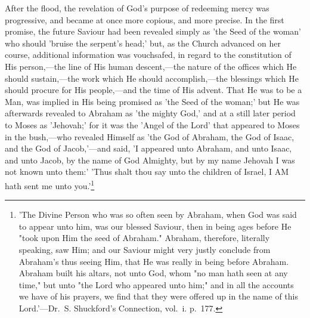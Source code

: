 \documentclass[
]{book}
\begin{document}
After the flood, the revelation of God's purpose of redeeming mercy was progressive, and became at once more copious, and more precise. In the first promise, the future Saviour had been revealed simply as 'the Seed of the woman' who should 'bruise the serpent's head;' but, as the Church advanced on her course, additional information was vouchsafed, in regard to the constitution of His person,---the line of His human descent,---the nature of the offices which He should sustain,---the work which He should accomplish,---the blessings which He should procure for His people,---and the time of His advent. That He was to be a Man, was implied in His being promised as 'the Seed of the woman;' but He was afterwards revealed to Abraham as 'the mighty God,' and at a still later period to Moses as 'Jehovah;' for it was the 'Angel of the Lord' that appeared to Moses in the bush,---who revealed Himself as 'the God of Abraham, the God of Isaac, and the God of Jacob,'---and said, 'I appeared unto Abraham, and unto Isaac, and unto Jacob, by the name of God Almighty, but by my name Jehovah I was not known unto them:' 'Thus shalt thou say unto the children of Israel, I AM hath sent me unto you.'\footnote{'The Divine Person who was so often seen by Abraham, when God was said to appear unto him, was our blessed Saviour, then in being ages before He "took upon Him the seed of Abraham." Abraham, therefore, literally speaking, saw Him; and our Saviour might very justly conclude from Abraham's thus seeing Him, that He was really in being before Abraham. Abraham built his altars, not unto God, whom "no man hath seen at any time," but unto "the Lord who appeared unto him;" and in all the accounts we have of his prayers, we find that they were offered up in the name of this Lord.'---Dr.~S. Shuckford's Connection, vol.~i. p.~177.}
\end{document}
